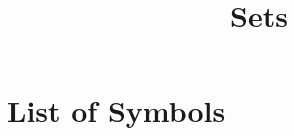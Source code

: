 \documentclass{article}
\title{Sets}
\begin{document}
\maketitle	




\section*{List of Symbols}
\PrintListOfSymbols
\end{document}
